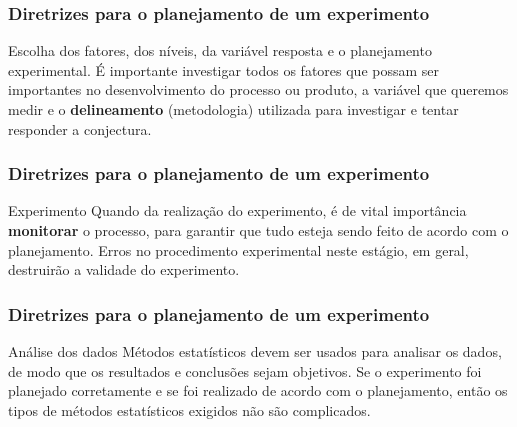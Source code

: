 \documentclass[14pt,aspectratio=1610]{beamer}
\begin{document}
\begin{frame}{}
\frametitle{Diretrizes para o planejamento de um experimento}
\begin{block}{Escolha dos fatores, dos níveis, da variável resposta e o planejamento experimental.}
\justifying
É importante investigar todos os fatores que possam ser importantes no desenvolvimento do processo ou produto, a variável que queremos medir e o \textbf{delineamento} 
(metodologia) utilizada para investigar e tentar responder a conjectura.
\end{block}
\end{frame}



\begin{frame}{}
\frametitle{Diretrizes para o planejamento de um experimento}
\begin{block}{Experimento}
\justifying
Quando da realização do experimento, é de vital importância \textbf{monitorar} o processo, para garantir que tudo esteja sendo feito de acordo com o planejamento. Erros no 
procedimento experimental neste estágio, em geral, destruirão a validade do experimento.
\end{block}
\end{frame}

\begin{frame}{}
\frametitle{Diretrizes para o planejamento de um experimento}
\begin{block}{Análise dos dados}
\justifying
Métodos estatísticos devem ser usados para analisar os dados, de modo que os resultados e conclusões sejam objetivos. Se o experimento foi planejado corretamente 
e se foi realizado de acordo com o planejamento, então os tipos de métodos estatísticos exigidos não são
complicados.
\end{block}
\end{frame}
\end{document}
